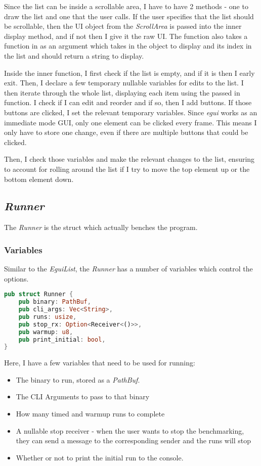 \documentclass{article}
\begin{document}
\begin{multicols*}{2}
	Since the list can be inside a scrollable area, I have to have 2 methods - one to draw the list and one that the user calls. If the user specifies that the list should be scrollable, then the UI object from the \textit{ScrollArea} is passed into the inner display method, and if not then I give it the raw UI. The function also takes a function in as an argument which takes in the object to display and its index in the list and should return a string to display.

Inside the inner function, I first check if the list is empty, and if it is then I early exit. Then, I declare a few temporary nullable variables for edits to the list. I then iterate through the whole list, displaying each item using the passed in function. I check if I can edit and reorder and if so, then I add buttons. If those buttons are clicked, I set the relevant temporary variables. Since \textit{egui} works as an immediate mode GUI, only one element can be clicked every frame. This means I only have to store one change, even if there are multiple buttons that could be clicked.

Then, I check those variables and make the relevant changes to the list, ensuring to account for rolling around the list if I try to move the top element up or the bottom element down.


\subsection{\textit{Runner}}
The \textit{Runner} is the struct which actually benches the program.

\subsubsection{Variables}
Similar to the \textit{EguiList}, the \textit{Runner} has a number of variables which control the options.

\begin{lstlisting}[language=Rust]
pub struct Runner {
	pub binary: PathBuf,
	pub cli_args: Vec<String>,
	pub runs: usize,
	pub stop_rx: Option<Receiver<()>>,
	pub warmup: u8,
	pub print_initial: bool,
}
\end{lstlisting}

Here, I have a few variables that need to be used for running:
\begin{itemize}
	\item The binary to run, stored as a \textit{PathBuf}.
	\item The CLI Arguments to pass to that binary
	\item How many timed and warmup runs to complete
	\item A nullable stop receiver - when the user wants to stop the benchmarking, they can send a message to the corresponding sender and the runs will stop
	\item Whether or not to print the initial run to the console.
\end{itemize}


\end{multicols*}
\end{document}
